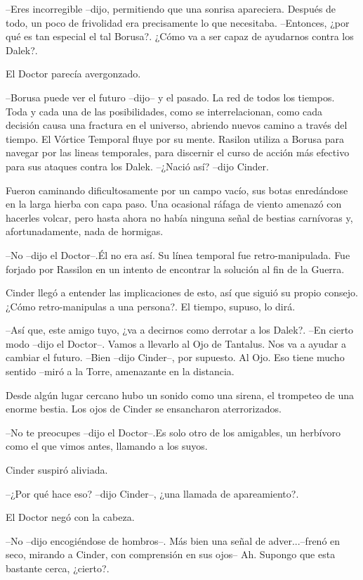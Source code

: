 --Eres incorregible --dijo, permitiendo que una sonrisa apareciera. Después de todo, un poco de frivolidad era precisamente lo que necesitaba.
--Entonces, ¿por qué es tan especial el tal Borusa?. ¿Cómo va a ser capaz de ayudarnos contra los Dalek?.

El Doctor parecía avergonzado. 

--Borusa puede ver el futuro --dijo-- y el pasado. La red de todos los tiempos. Toda y cada una de las posibilidades, como se interrelacionan, como cada decisión causa una fractura en el universo, abriendo nuevos camino a través del tiempo. El Vórtice Temporal fluye por su mente. Rasilon utiliza a Borusa para navegar por las lineas temporales, para discernir el curso de acción más efectivo para sus ataques contra los Dalek.
--¿Nació así? --dijo Cinder.

Fueron caminando dificultosamente por un campo vacío, sus botas enredándose en la larga hierba con capa paso. Una ocasional ráfaga de viento amenazó con hacerles volcar, pero hasta ahora no había ninguna señal de bestias carnívoras y, afortunadamente, nada de hormigas.

--No --dijo el Doctor--.Él no era así. Su línea temporal fue retro-manipulada. Fue forjado por Rassilon en un intento de encontrar la solución al fin de la Guerra.

Cinder llegó a entender las implicaciones de esto, así que siguió su propio consejo. ¿Cómo retro-manipulas a una persona?. El tiempo, supuso, lo dirá. 

--Así que, este amigo tuyo, ¿va a decirnos como derrotar a los Dalek?.
--En cierto modo --dijo el Doctor--. Vamos a llevarlo al Ojo de Tantalus. Nos va a ayudar a cambiar el futuro.
--Bien --dijo Cinder--, por supuesto. Al Ojo. Eso tiene mucho sentido --miró a la Torre, amenazante en la distancia.

Desde algún lugar cercano hubo un sonido como una sirena, el trompeteo de una enorme bestia. Los ojos de Cinder se ensancharon aterrorizados.

--No te preocupes --dijo el Doctor--.Es solo otro de los amigables, un herbívoro como el que vimos antes, llamando a los suyos.

Cinder suspiró aliviada. 

--¿Por qué hace eso? --dijo Cinder--, ¿una llamada de apareamiento?.

El Doctor negó con la cabeza. 

--No --dijo encogiéndose de hombros--. Más bien una señal de adver...--frenó en seco, mirando a Cinder, con comprensión en sus ojos-- Ah. Supongo que esta bastante cerca, ¿cierto?.

